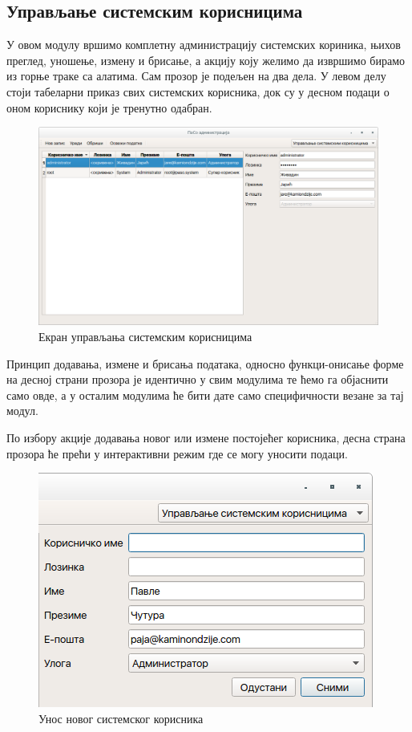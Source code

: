 \documentclass[a4paper, 12pt, diplomski]{etfcyr}
\begin{document}
			\newpage

			\subsection{Управљање системским корисницима}
				\begin{justify}
					У овом модулу вршимо комплетну администрацију системских кориника, њихов преглед, уношење, измену и брисање, а акцију коју желимо да извршимо бирамо из горње траке са алатима. Сам прозор је подељен на два дела. У левом делу стоји табеларни приказ свих системских корисника, док су у десном подаци о оном кориснику који је тренутно одабран.
					\begin{figure}[h]
						\begin{center}
							\includegraphics[width=1.0\textwidth]{manual/system_users.png}
						\end{center}
						\caption{Екран управљања системским корисницима}
						\label{figure:system_users}
					\end{figure}

					Принцип додавања, измене и брисања података, односно функци-онисање форме на десној страни прозора је идентично у свим модулима те ћемо га објаснити само овде, а у осталим модулима ће бити дате само специфичности везане за тај модул.

					\newpage

					По избору акције додавања новог или измене постојећег корисника, десна страна прозора ће прећи у интерактивни режим где се могу уносити подаци.
					\begin{figure}[h]
						\begin{center}
							\includegraphics[width=.5\textwidth]{manual/system_user_edit.png}
						\end{center}
						\caption{Унос новог системског корисника}
						\label{figure:system_user_edit}
					\end{figure}


\end{justify}
\end{document}
